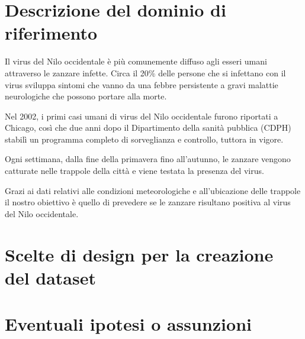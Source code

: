 \section{Descrizione del dominio di riferimento}

Il virus del Nilo occidentale è più comunemente diffuso agli esseri umani attraverso le zanzare infette. Circa il 20\% delle persone che si infettano con il virus sviluppa sintomi che vanno da una febbre persistente a gravi malattie neurologiche che possono portare alla morte.

Nel 2002, i primi casi umani di virus del Nilo occidentale furono riportati a Chicago, così che due anni dopo il Dipartimento della sanità pubblica (CDPH) stabilì un programma completo di sorveglianza e controllo, tuttora in vigore.

Ogni settimana, dalla fine della primavera fino all'autunno, le zanzare vengono catturate nelle trappole della città e viene testata la presenza del virus. 

Grazi ai dati relativi alle condizioni meteorologiche e all'ubicazione delle trappole il nostro obiettivo è quello di prevedere se le zanzare risultano positiva al virus del Nilo occidentale.





\section{Scelte di design per la creazione del dataset}

\section{Eventuali ipotesi o assunzioni}

